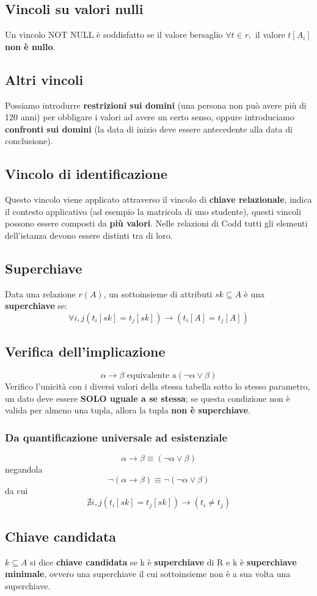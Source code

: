 \documentclass[10pt,twocolumn]{article}
\begin{document}
\subsection{Vincoli su valori nulli}
Un vincolo NOT NULL è soddisfatto se il valore bersaglio $\forall t \in r,$  il valore $t[A_i]$ \textbf{non è nullo}.
\subsection{Altri vincoli}
Possiamo introdurre \textbf{restrizioni sui domini} (una persona non può avere più di 120 anni) per obbligare i valori ad avere un certo senso, oppure introduciamo \textbf{confronti sui domini} (la data di inizio deve essere antecedente alla data di conclusione).
\subsection{Vincolo di identificazione}
Questo vincolo viene applicato attraverso il vincolo di \textbf{chiave relazionale}, indica il contesto applicativo (ad esempio la matricola di uno studente), questi vincoli possono essere composti da \textbf{più valori}. Nelle relazioni di Codd tutti gli elementi dell'istanza devono essere distinti tra di loro.
\subsection{Superchiave}
Data una relazione $r(A)$, un sottoinsieme di attributi $sk \subseteq A$ è una \textbf{superchiave} se: \[ \forall i,j (t_i[sk] = t_j[sk]) \rightarrow (t_i[A] = t_j[A])\] 
\subsection{Verifica dell'implicazione}
\[\alpha \rightarrow \beta \text{ equivalente a} (\lnot \alpha \lor \beta) \]
Verifico l'unicità con i diversi valori della stessa tabella sotto lo stesso parametro, un dato deve essere \textbf{SOLO uguale a se stessa}; se questa condizione non è valida per almeno una tupla, allora la tupla \textbf{non è superchiave}.
\subsubsection{Da quantificazione universale ad esistenziale}
\[ \alpha \rightarrow \beta \equiv (\neg \alpha \lor \beta)\]
negandola
\[\neg (\alpha \rightarrow \beta) \equiv \neg(\neg \alpha \lor \beta)\] da cui \[ \nexists i,j (t_i[sk]=t_j[sk]) \rightarrow (t_i \neq t_j)\]
\subsection{Chiave candidata}
$k \subseteq A$ si dice \textbf{chiave candidata} se k è \textbf{superchiave} di R e k è \textbf{superchiave minimale}, ovvero una superchiave il cui sottoinsieme non è a sua volta una superchiave.
\end{document}
